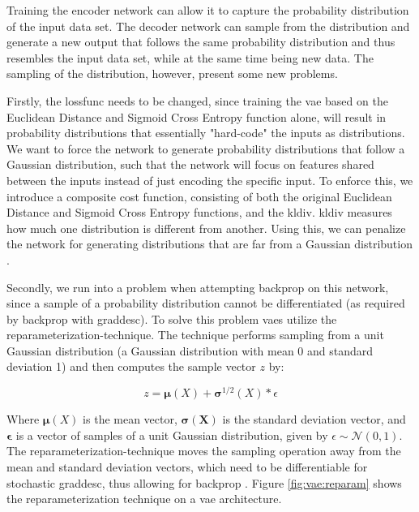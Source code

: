 Training the encoder network can allow it to capture the probability distribution of the input data set. The decoder network can sample from the distribution and generate a new output that follows the same probability distribution and thus resembles the input data set, while at the same time being new data. The sampling of the distribution, however, present some new problems.

Firstly, the \gls{lossfunc} needs to be changed, since training the \gls{vae} based on the Euclidean Distance and Sigmoid Cross Entropy function alone, will result in probability distributions that essentially "hard-code" the inputs as distributions. We want to force the network to generate probability distributions that follow a Gaussian distribution, such that the network will focus on features shared between the inputs instead of just encoding the specific input. To enforce this, we introduce a composite cost function, consisting of both the original Euclidean Distance and Sigmoid Cross Entropy functions, and the \gls{kldiv}. \gls{kldiv} measures how much one distribution is different from another. Using this, we can penalize the network for generating distributions that are far from a Gaussian distribution \cite{understanding_vae}.

Secondly, we run into a problem when attempting \gls{backprop} on this network, since a sample of a probability distribution cannot be differentiated (as required by \gls{backprop} with \gls{graddesc}). To solve this problem \glspl{vae} utilize the reparameterization-technique. The technique performs sampling from a unit Gaussian distribution (a Gaussian distribution with mean 0 and standard deviation 1) and then computes the sample vector $z$ by:
\begin{center}
\begin{equation}
    z = \boldsymbol{\mu}(X) + \boldsymbol{\sigma}^{1/2}(X) * \epsilon
    \label{eq:reparameterization}
\end{equation}
\end{center}
Where $\boldsymbol{\mu}(X)$ is the mean vector, $\boldsymbol{\sigma(X)}$ is the standard deviation vector, and $\boldsymbol{\epsilon}$ is a vector of samples of a unit Gaussian distribution, given by $\epsilon \sim \mathcal{N}(0,1)$. 
The reparameterization-technique moves the sampling operation away from the mean and standard deviation vectors, which need to be differentiable for stochastic \gls{graddesc}, thus allowing for \gls{backprop} \cite{doersch2016tutorial}. Figure \ref{fig:vae:reparam} shows the reparameterization technique on a \gls{vae} architecture.

